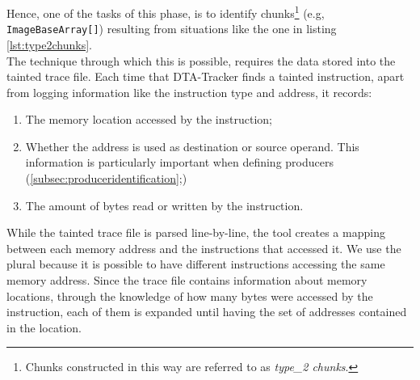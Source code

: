 \documentclass[LaM,binding=0.6cm]{sapthesis}
\begin{document}
Hence, one of the tasks of this phase, is to identify chunks\footnote{Chunks constructed in this way are referred to as \textit{type\_2 chunks}.} (e.g, \texttt{ImageBaseArray[]}) resulting from situations like the one in listing \ref{lst:type2chunks}.\\
The technique through which this is possible, requires the data stored into the tainted trace file. Each time that DTA-Tracker finds a tainted instruction, apart from logging information like the instruction type and address, it records:
\begin{enumerate}
\item The memory location accessed by the instruction;
\item Whether the address is used as destination or source operand. This information is particularly important when defining producers (\autoref{subsec:produceridentification};)
\item The amount of bytes read or written by the instruction.
\end{enumerate}
While the tainted trace file is parsed line-by-line, the tool creates a mapping between each memory address and the instructions that accessed it. We use the plural because it is possible to have different instructions accessing the same memory address. Since the trace file contains information about memory locations, through the knowledge of how many bytes were accessed by the instruction, each of them is expanded until having the set of addresses contained in the location.\\
\end{document}
